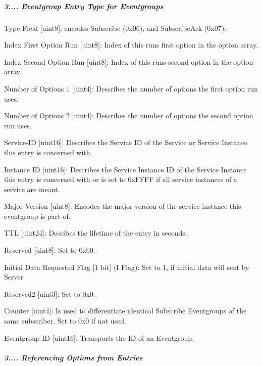 \subparagraph*{3.... Eventgroup Entry Type for Eventgroups}


\begin{DoxyItemize}
\item Type Field \mbox{[}uint8\mbox{]}\+: encodes Subscribe (0x06), and Subscribe\+Ack (0x07).
\item Index First Option Run \mbox{[}uint8\mbox{]}\+: Index of this runs first option in the option array.
\item Index Second Option Run \mbox{[}uint8\mbox{]}\+: Index of this runs second option in the option array.
\item Number of Options 1 \mbox{[}uint4\mbox{]}\+: Describes the number of options the first option run uses.
\item Number of Options 2 \mbox{[}uint4\mbox{]}\+: Describes the number of options the second option run uses.
\item Service-\/\+ID \mbox{[}uint16\mbox{]}\+: Describes the Service ID of the Service or Service Instance this entry is concerned with.
\item Instance ID \mbox{[}uint16\mbox{]}\+: Describes the Service Instance ID of the Service Instance this entry is concerned with or is set to 0x\+F\+F\+FF if all service instances of a service are meant.
\item Major Version \mbox{[}uint8\mbox{]}\+: Encodes the major version of the service instance this eventgroup is part of.
\item T\+TL \mbox{[}uint24\mbox{]}\+: Descibes the lifetime of the entry in seconds.
\item Reserved \mbox{[}uint8\mbox{]}\+: Set to 0x00.
\item Initial Data Requested Flag \mbox{[}1 bit\mbox{]} (I Flag)\+: Set to 1, if initial data will sent by Server
\item Reserved2 \mbox{[}uint3\mbox{]}\+: Set to 0x0.
\item Counter \mbox{[}uint4\mbox{]}\+: Is used to differentiate identical Subscribe Eventgroups of the same subscriber. Set to 0x0 if not used.
\item Eventgroup ID \mbox{[}uint16\mbox{]}\+: Transports the ID of an Eventgroup.
\end{DoxyItemize}

\subparagraph*{3.... Referencing Options from Entries}


